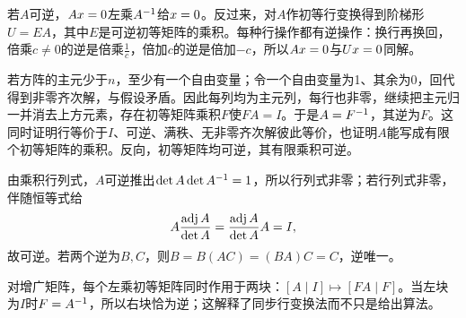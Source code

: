 \label{der:2-2}
若$A$可逆，$Ax=0$左乘$A^{-1}$给$x=0$。反过来，对$A$作初等行变换得到阶梯形$U=EA$，其中$E$是可逆初等矩阵的乘积。每种行操作都有逆操作：换行再换回，倍乘$c\ne0$的逆是倍乘$\frac{1}{c}$，倍加$c$的逆是倍加$-c$，所以$Ax=0$与$Ux=0$同解。

若方阵的主元少于$n$，至少有一个自由变量；令一个自由变量为1、其余为0，回代得到非零齐次解，与假设矛盾。因此每列均为主元列，每行也非零，继续把主元归一并消去上方元素，存在初等矩阵乘积$F$使$FA=I$。于是$A=F^{-1}$，其逆为$F$。这同时证明行等价于$I$、可逆、满秩、无非零齐次解彼此等价，也证明$A$能写成有限个初等矩阵的乘积。反向，初等矩阵均可逆，其有限乘积可逆。

由乘积行列式，$A$可逆推出$\det A\det A^{-1}=1$，所以行列式非零；若行列式非零，伴随恒等式给
\[A\dfrac{\operatorname{adj} A}{\det A}=\dfrac{\operatorname{adj} A}{\det A}A=I,\]
故可逆。若两个逆为$B,C$，则$B=B(AC)=(BA)C=C$，逆唯一。

对增广矩阵，每个左乘初等矩阵同时作用于两块：$[A\mid I]\mapsto[FA\mid F]$。当左块为$I$时$F=A^{-1}$，所以右块恰为逆；这解释了同步行变换法而不只是给出算法。
